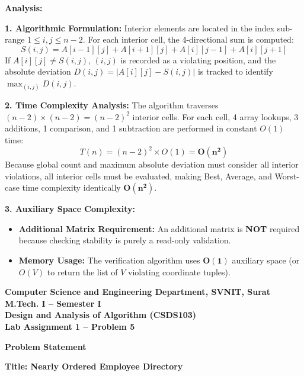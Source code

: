 \documentclass[12pt]{article}
\begin{document}
\newpage

\textbf{Analysis:}

\textbf{1. Algorithmic Formulation:}
Interior elements are located in the index sub-range $1 \le i, j \le n-2$. For each interior cell, the 4-directional sum is computed:
$$S(i, j) = A[i-1][j] + A[i+1][j] + A[i][j-1] + A[i][j+1]$$
If $A[i][j] \ne S(i, j)$, $(i, j)$ is recorded as a violating position, and the absolute deviation $D(i, j) = |A[i][j] - S(i, j)|$ is tracked to identify $\max_{(i, j)} D(i, j)$.

\textbf{2. Time Complexity Analysis:}
The algorithm traverses $(n-2) \times (n-2) = (n-2)^2$ interior cells. For each cell, 4 array lookups, 3 additions, 1 comparison, and 1 subtraction are performed in constant $O(1)$ time:
$$T(n) = (n-2)^2 \times O(1) = \mathbf{O(n^2)}$$
Because global count and maximum absolute deviation must consider all interior violations, all interior cells must be evaluated, making Best, Average, and Worst-case time complexity identically $\mathbf{O(n^2)}$.

\textbf{3. Auxiliary Space Complexity:}
\begin{itemize}
    \item \textbf{Additional Matrix Requirement:} An additional matrix is \textbf{NOT} required because checking stability is purely a read-only validation.
    \item \textbf{Memory Usage:} The verification algorithm uses $\mathbf{O(1)}$ auxiliary space (or $O(V)$ to return the list of $V$ violating coordinate tuples).
\end{itemize}

\newpage


\begin{center}
\textbf{Computer Science and Engineering Department, SVNIT, Surat}\\
\textbf{M.Tech. I -- Semester I}\\
\textbf{Design and Analysis of Algorithm (CSDS103)}\\
\textbf{Lab Assignment 1 -- Problem 5}
\end{center}

\vspace{0.4cm}

\textbf{Problem Statement}

\textbf{Title: Nearly Ordered Employee Directory}
\end{document}

